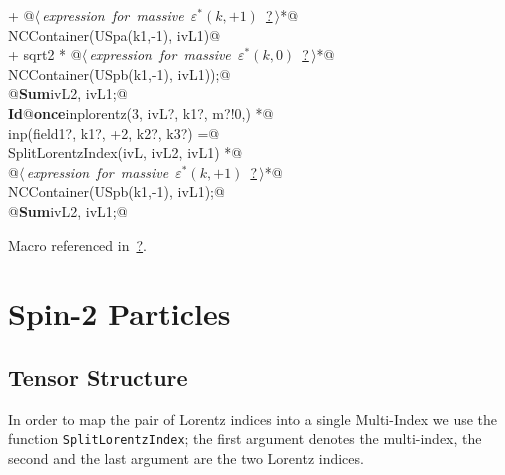 \documentclass[a4paper,12pt]{amsart}
\renewcommand{\NWlink}[2]{\hyperlink{#1}{#2}}
\renewcommand{\NWtxtMacroRefIn}{Macro referenced in}
\renewcommand{\NWsep}{${\diamond}$}
\begin{document}
\begin{flushleft}
\begin{minipage}{\linewidth}
\begin{list}{}{}
\mbox{}\verb@   + @\hbox{$\langle\,${\it expression for massive $\varepsilon^\ast(k, +1)$}\nobreak\ {\footnotesize \NWlink{nuweb?}{?}}$\,\rangle$}\verb@ *@\\
\mbox{}\verb@     NCContainer(USpa(k1,-1), ivL1)@\\
\mbox{}\verb@   + sqrt2 * @\hbox{$\langle\,${\it expression for massive $\varepsilon^\ast(k, 0)$}\nobreak\ {\footnotesize \NWlink{nuweb?}{?}}$\,\rangle$}\verb@ *@\\
\mbox{}\verb@     NCContainer(USpb(k1,-1), ivL1));@\\
\mbox{}\verb@   @\hbox{\sffamily\bfseries Sum}\verb@ ivL2, ivL1;@\\
\mbox{}\verb@@\hbox{\sffamily\bfseries Id}\verb@ @\hbox{\sffamily\bfseries once}\verb@ inplorentz(3, ivL?, k1?, m?!{0,}) *@\\
\mbox{}\verb@      inp(field1?, k1?, +2, k2?, k3?) =@\\
\mbox{}\verb@   SplitLorentzIndex(ivL, ivL2, ivL1) *@\\
\mbox{}\verb@   @\hbox{$\langle\,${\it expression for massive $\varepsilon^\ast(k, +1)$}\nobreak\ {\footnotesize \NWlink{nuweb?}{?}}$\,\rangle$}\verb@ *@\\
\mbox{}\verb@   NCContainer(USpb(k1,-1), ivL1);@\\
\mbox{}\verb@   @\hbox{\sffamily\bfseries Sum}\verb@ ivL2, ivL1;@\\
\mbox{}\verb@@{\NWsep}
\end{list}
\vspace{-1.5ex}
\footnotesize
\begin{list}{}{\setlength{\itemsep}{-\parsep}\setlength{\itemindent}{-\leftmargin}}
\item \NWtxtMacroRefIn\ \NWlink{nuweb?}{?}.

\item{}
\end{list}
\end{minipage}\vspace{4ex}
\end{flushleft}

\section{Spin-2 Particles}
\subsection{Tensor Structure}
In order to map the pair of Lorentz indices into a single Multi-Index
we use the function \texttt{SplitLorentzIndex}; the first argument denotes
the multi-index, the second and the last argument are the two Lorentz indices.
\end{document}

